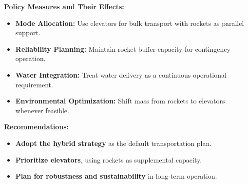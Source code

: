 \documentclass[12pt]{mcmthesis}
\begin{document}
\noindent\textbf{Policy Measures and Their Effects:}
\vspace{-0.3em}
\begin{itemize}
    \setlength{\itemsep}{1pt}
    \setlength{\topsep}{1pt}
    \setlength{\parsep}{0pt}
    \item \textbf{Mode Allocation:}
          Use elevators for bulk transport with rockets as parallel support.
    \item \textbf{Reliability Planning:}
          Maintain rocket buffer capacity for contingency operation.
    \item \textbf{Water Integration:}
          Treat water delivery as a continuous operational requirement.
    \item \textbf{Environmental Optimization:}
          Shift mass from rockets to elevators whenever feasible.
\end{itemize}

\noindent\textbf{Recommendations:}
\vspace{-0.3em}
\begin{itemize}
    \setlength{\itemsep}{1pt}
    \setlength{\topsep}{1pt}
    \setlength{\parsep}{0pt}
    \item \textbf{Adopt the hybrid strategy} as the default transportation plan.
    \item \textbf{Prioritize elevators}, using rockets as supplemental capacity.
    \item \textbf{Plan for robustness and sustainability} in long-term operation.
\end{itemize}




\AImatter
\pagestyle{empty}
\thispagestyle{empty}


\end{document}
